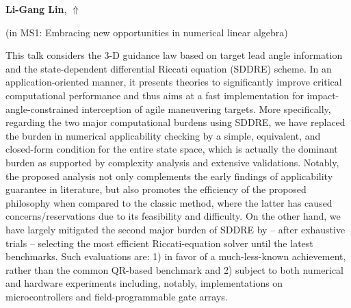 \documentclass[ILAS2025-program.tex]{subfiles}
\begin{document}
\hypertarget{down0072}{}\begin{ilasabstract}
    
\textbf{Li-Gang Lin},  \hfill \hyperlink{up0072}{$\Uparrow$}
    
    
(in {\color{mstitle}MS1: Embracing new opportunities in numerical linear algebra})
        
\mtskip
    This talk considers the 3-D guidance law based on target lead angle information and the state-dependent differential Riccati equation (SDDRE) scheme. In an application-oriented manner, it presents theories to significantly improve critical computational performance and thus aims at a fast implementation for impact-angle-constrained interception of agile maneuvering targets. More specifically, regarding the two major computational burdens using SDDRE, we have replaced the burden in numerical applicability checking by a simple, equivalent, and closed-form condition for the entire state space, which is actually the dominant burden as supported by complexity analysis and extensive validations. Notably, the proposed analysis not only complements the early findings of applicability guarantee in literature, but also promotes the efficiency of the proposed philosophy when compared to the classic method, where the latter has caused concerns/reservations due to its feasibility and difficulty. On the other hand, we have largely mitigated the second major burden of SDDRE by -- after exhaustive trials -- selecting the most efficient Riccati-equation solver until the latest benchmarks. Such evaluations are: 1) in favor of a much-less-known achievement, rather than the common QR-based benchmark and 2) subject to both numerical and hardware experiments including, notably, implementations on microcontrollers and field-programmable gate arrays.

\end{ilasabstract}
    
\end{document}
